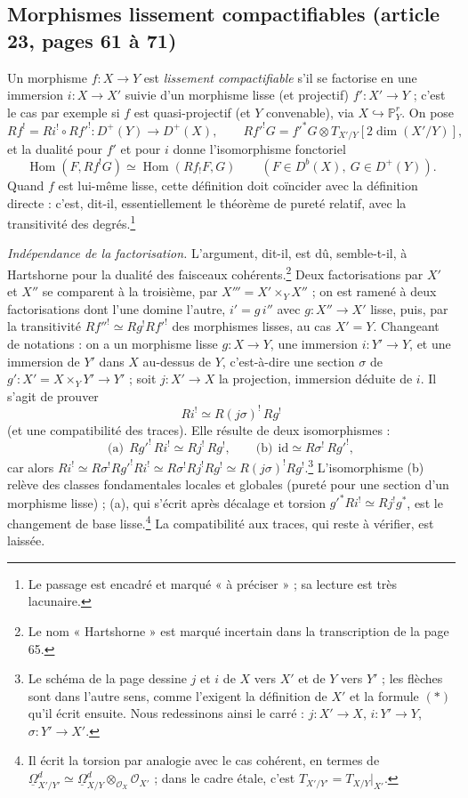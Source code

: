 \documentclass[11pt,a4paper]{article}
\begin{document}
\subsection*{Morphismes lissement compactifiables (article 23, pages 61 à 71)}

Un morphisme $f : X \to Y$ est \emph{lissement compactifiable} s'il se
factorise en une immersion $i : X \to X'$ suivie d'un morphisme lisse (et
projectif) $f' : X' \to Y$ ; c'est le cas par exemple si $f$ est quasi-projectif (et $Y$
convenable), via $X \hookrightarrow \mathbb{P}^{r}_{Y}$. On pose
\[
  Rf^{!} = Ri^{!} \circ Rf'^{!} : D^{+}(Y) \to D^{+}(X), \qquad Rf'^{!}G =
  f'^{*}G \otimes T_{X'/Y}[2\dim(X'/Y)],
\]
et la dualité pour $f'$ et pour $i$ donne l'isomorphisme fonctoriel
\[
  \operatorname{Hom}(F, Rf^{!}G) \simeq \operatorname{Hom}(Rf_{!}F, G) \qquad
  (F \in D^{b}(X),\ G \in D^{+}(Y)).
\]
Quand $f$ est lui-même lisse, cette définition doit coïncider avec la
définition directe : c'est, dit-il, essentiellement le théorème de pureté
relatif, avec la transitivité des degrés.\footnote{Le passage est encadré et
marqué « à préciser » ; sa lecture est très lacunaire.}

\emph{Indépendance de la factorisation.} L'argument, dit-il, est dû,
semble-t-il, à Hartshorne pour la dualité des faisceaux
cohérents.\footnote{Le nom « Hartshorne » est marqué incertain dans la
transcription de la page 65.} Deux factorisations par
$X'$ et $X''$ se comparent à la troisième, par $X''' = X' \times_{Y} X''$ ; on
est ramené à deux factorisations dont l'une domine l'autre, $i' = g\,i''$ avec $g :
X'' \to X'$ lisse, puis, par la transitivité $Rf''^{!} \simeq Rg^{!}Rf'^{!}$ des
morphismes lisses, au cas $X' = Y$. Changeant de notations : on a un morphisme
lisse $g : X \to Y$, une immersion $i : Y' \to Y$, et une immersion de $Y'$
dans $X$ au-dessus de $Y$, c'est-à-dire une section $\sigma$ de $g' : X' = X
\times_{Y} Y' \to Y'$ ; soit $j : X' \to X$ la projection, immersion déduite de
$i$. Il s'agit de prouver
\[
  Ri^{!} \simeq R(j\sigma)^{!}\,Rg^{!}
\]
(et une compatibilité des traces). Elle résulte de deux isomorphismes :
\[
  \text{(a)}\ \ Rg'^{!}\,Ri^{!} \simeq Rj^{!}\,Rg^{!}, \qquad
  \text{(b)}\ \ \mathrm{id} \simeq R\sigma^{!}\,Rg'^{!},
\]
car alors $Ri^{!} \simeq R\sigma^{!}Rg'^{!}Ri^{!} \simeq R\sigma^{!}Rj^{!}Rg^{!}
\simeq R(j\sigma)^{!}Rg^{!}$.\footnote{Le schéma de la page dessine $j$ et $i$
de $X$ vers $X'$ et de $Y$ vers $Y'$ ; les flèches sont dans l'autre sens, comme
l'exigent la définition de $X'$ et la formule $(*)$ qu'il écrit ensuite. Nous
redessinons ainsi le carré : $j : X' \to X$, $i : Y' \to Y$, $\sigma : Y' \to
X'$.} L'isomorphisme (b) relève des classes fondamentales locales et globales
(pureté pour une section d'un morphisme lisse) ; (a), qui s'écrit après
décalage et torsion $g'^{*}Ri^{!} \simeq Rj^{!}g^{*}$, est le changement de base
lisse.\footnote{Il écrit la torsion par analogie avec le cas cohérent, en termes
de $\underline{\Omega}^{d}_{X'/Y'} \simeq \underline{\Omega}^{d}_{X/Y}
\otimes_{\mathcal{O}_{X}} \mathcal{O}_{X'}$ ; dans le cadre étale, c'est
$T_{X'/Y'} = T_{X/Y}|_{X'}$.} La compatibilité aux traces, qui reste à vérifier,
est laissée.
\end{document}
